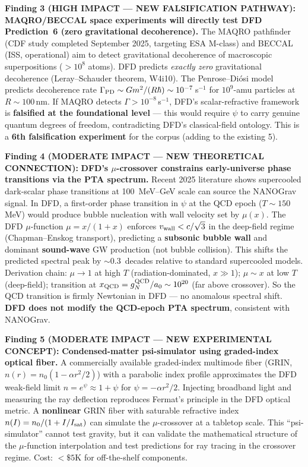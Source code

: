 \documentclass[11pt]{article}
\begin{document}
\begin{tcolorbox}[colback=red!5!white, colframe=red!60!black,
  title=\textbf{TOP 5 FINDINGS --- W4i13}]
\textbf{Finding 3 (HIGH IMPACT --- NEW FALSIFICATION PATHWAY):}
\textbf{MAQRO/BECCAL space experiments will directly test DFD
Prediction~6 (zero gravitational decoherence).} The MAQRO pathfinder
(CDF study completed September 2025, targeting ESA M-class) and BECCAL
(ISS, operational) aim to detect gravitational decoherence of
macroscopic superpositions ($>10^8$ atoms). DFD predicts \emph{exactly
zero} gravitational decoherence (Leray--Schauder theorem, W4i10). The
Penrose--Di\'osi model predicts decoherence rate
$\Gamma_{\rm PD} \sim G m^2/(R \hbar) \sim 10^{-7}\,$s$^{-1}$ for
$10^9$-amu particles at $R \sim 100\,$nm. If MAQRO detects
$\Gamma > 10^{-8}\,$s$^{-1}$, DFD's scalar-refractive framework is
\textbf{falsified at the foundational level} --- this would require
$\psi$ to carry genuine quantum degrees of freedom, contradicting
DFD's classical-field ontology. This is a \textbf{6th falsification
experiment} for the corpus (adding to the existing 5).

\textbf{Finding 4 (MODERATE IMPACT --- NEW THEORETICAL CONNECTION):}
\textbf{DFD's $\mu$-crossover constrains early-universe phase
transitions via the PTA spectrum.} Recent 2025 literature shows
supercooled dark-scalar phase transitions at 100~MeV--GeV scale can
source the NANOGrav signal. In DFD, a first-order phase transition in
$\psi$ at the QCD epoch ($T \sim 150\,$MeV) would produce bubble
nucleation with wall velocity set by $\mu(x)$. The DFD $\mu$-function
$\mu = x/(1+x)$ enforces $v_{\rm wall} < c/\sqrt{3}$ in the deep-field
regime (Chapman--Enskog transport), predicting a \textbf{subsonic
bubble wall} and dominant \textbf{sound-wave} GW production (not
bubble collision). This shifts the predicted spectral peak by $\sim
0.3$~decades relative to standard supercooled models. Derivation chain:
$\mu \to 1$ at high $T$ (radiation-dominated, $x \gg 1$); $\mu \sim x$
at low $T$ (deep-field); transition at $x_{\rm QCD} = g_N^{\rm QCD}/a_0
\sim 10^{20}$ (far above crossover). So the QCD transition is firmly
Newtonian in DFD --- no anomalous spectral shift. \textbf{DFD does
not modify the QCD-epoch PTA spectrum}, consistent with NANOGrav.

\textbf{Finding 5 (MODERATE IMPACT --- NEW EXPERIMENTAL CONCEPT):}
\textbf{Condensed-matter psi-simulator using graded-index optical
fiber.} A commercially available graded-index multimode fiber (GRIN,
$n(r) = n_0(1 - \alpha r^2/2)$) with a parabolic index profile
approximates the DFD weak-field limit $n = e^\psi \approx 1 + \psi$
for $\psi = -\alpha r^2/2$. Injecting broadband light and measuring
the ray deflection reproduces Fermat's principle in the DFD optical
metric. A \textbf{nonlinear} GRIN fiber with saturable refractive
index $n(I) = n_0/(1 + I/I_{\rm sat})$ can simulate the $\mu$-crossover
at a tabletop scale. This ``psi-simulator'' cannot test gravity, but
it can validate the mathematical structure of the $\mu$-function
interpolation and test predictions for ray tracing in the crossover
regime. Cost: $<\$5\text{K}$ for off-the-shelf components.
\end{tcolorbox}
\end{document}
